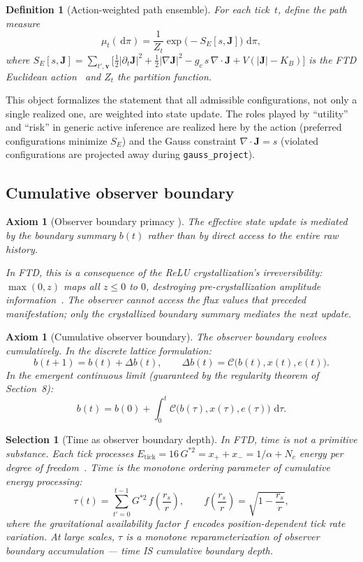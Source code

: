 \documentclass[11pt]{article}
\theoremstyle{tight}
\theoremstyle{plainroman}
\newtheorem{axiom}[theorem]{Axiom}
\newtheorem{selection}[theorem]{Selection}
\newtheorem{definition}[theorem]{Definition}
\newcommand{\dd}{\,\mathrm{d}}
\begin{document}
\begin{definition}[Action-weighted path ensemble]
For each tick~$t$, define the path measure
\[
\mu_t(\dd \pi)=\frac{1}{Z_t}\exp\!\bigl(-S_E[s,\mathbf J]\bigr)\,\dd \pi,
\]
where $S_E[s,\mathbf J]=\sum_{t',\mathbf v}\bigl[\tfrac12|\partial_t\mathbf J|^2+\tfrac12|\nabla\mathbf J|^2-g_c\,s\,\nabla\!\cdot\!\mathbf J+V(|\mathbf J|-K_B)\bigr]$ is the FTD Euclidean action~\cite{ftdpath} and $Z_t$ the partition function.
\end{definition}
This object formalizes the statement that all admissible configurations, not only a single realized one, are weighted into state update.
The roles played by ``utility'' and ``risk'' in generic active inference are realized here by the action (preferred configurations minimize $S_E$) and the Gauss constraint $\nabla\!\cdot\!\mathbf J=s$ (violated configurations are projected away during \texttt{gauss\_project}).

\subsection{Cumulative observer boundary}

\begin{axiom}[Observer boundary primacy {}]
The effective state update is mediated by the boundary summary $b(t)$ rather than by direct access to the entire raw history.

In FTD, this is a consequence of the ReLU crystallization's irreversibility: $\max(0,z)$ maps all $z\le 0$ to $0$, destroying pre-crystallization amplitude information~\cite{ftdvnc}.
The observer cannot access the flux values that preceded manifestation; only the crystallized boundary summary mediates the next update.
\end{axiom}

\begin{axiom}[Cumulative observer boundary]
The observer boundary evolves cumulatively. In the discrete lattice formulation:
\[
b(t+1)=b(t)+\Delta b(t), \qquad \Delta b(t)=\mathcal C\bigl(b(t),x(t),e(t)\bigr).
\]
In the emergent continuous limit (guaranteed by the regularity theorem of Section~8):
\[
b(t)=b(0)+\int_0^t \mathcal C\bigl(b(\tau),x(\tau),e(\tau)\bigr)\,\dd \tau.
\]
\end{axiom}

\begin{selection}[Time as observer boundary depth]
In FTD, time is not a primitive substance.
Each tick processes $E_{\text{tick}}=16\,G^{*2}=x_++x_-=1/\alpha+N_c$ energy per degree of freedom~\cite{ftdtime}.
Time is the monotone ordering parameter of cumulative energy processing:
\[
\tau(t)=\sum_{t'=0}^{t-1} G^{*2}\,f\!\left(\frac{r_s}{r}\right), \qquad f\!\left(\frac{r_s}{r}\right)=\sqrt{1-\frac{r_s}{r}},
\]
where the gravitational availability factor $f$ encodes position-dependent tick rate variation. At large scales, $\tau$ is a monotone reparameterization of observer boundary accumulation --- time IS cumulative boundary depth.
\end{selection}
\end{document}
